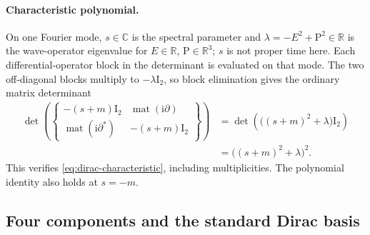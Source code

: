 \documentclass[11pt]{article}
\newcommand{\pvGreek}[1]{{#1}}
\newcommand{\vstyle}[1]{{\bm{\mathrm{#1}}}}
\newcommand{\pvpartial}{\pvGreek{\partial}}
\numberwithin{equation}{section}
\newcommand{\R}{\mathbb{R}}
\newcommand{\C}{\mathbb{C}}
\newcommand{\ii}{\mathrm{i}}
\newcommand{\bp}{\vstyle{P}}
\newcommand{\bI}{\vstyle{I}}
\begin{document}
\paragraph{Characteristic polynomial.}
On one Fourier mode, $s\in\C$ is the spectral parameter and
$\lambda=-E^2+\bp^2\in\R$ is the wave-operator eigenvalue
for $E\in\R$, $\bp\in\R^3$; $s$ is not proper time here.
Each differential-operator block in the determinant is evaluated on that mode.  The two off-diagonal blocks multiply to
$-\lambda\bI_2$, so block elimination gives the ordinary matrix determinant
\begin{equation}
 \begin{aligned}
 \det\left(\begin{Bmatrix}
 -(s+m)\bI_2&\operatorname{mat}(\ii\pvpartial)\\
 \operatorname{mat}(\ii\pvpartial^*)&-(s+m)\bI_2
 \end{Bmatrix}\right)
 &=\det\left(\bigl((s+m)^2+\lambda\bigr)\bI_2\right)\\
 &=\bigl((s+m)^2+\lambda\bigr)^2.
 \end{aligned}
 \label{eq:matrix-dirac-characteristic}
\end{equation}
This verifies \eqref{eq:dirac-characteristic}, including multiplicities.
The polynomial identity also holds at $s=-m$.

\subsection{Four components and the standard Dirac basis}
\label{sec:matrix-dirac-components}
\end{document}
